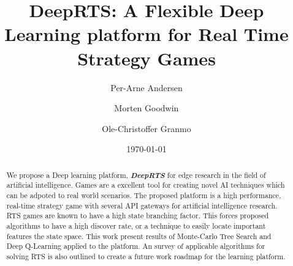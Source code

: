 \documentclass[fleqn,10pt]{article} %
\title{DeepRTS: A Flexible Deep Learning platform for Real Time Strategy Games}
\date{\today}
\author{Per-Arne Andersen \and Morten Goodwin \and Ole-Christoffer Granmo}
\begin{document}
\flushbottom %

\maketitle %

\begin{abstract}
We propose a Deep learning platform, \textit{\textbf{DeepRTS}} for edge research in the field of artificial intelligence. 
Games are a excellent tool for creating novel AI techniques which can be adpoted to real world scenarios. The proposed platform is a high performance, real-time strategy game with several API gateways for artificial intelligence research. RTS games are known to have a high state branching factor. This forces proposed algorithms to have a high discover rate, or a technique to easily locate important features the state space. This work present results of Monte-Carlo Tree Search and Deep Q-Learning applied to the platform. An survey of applicable algorithms for solving RTS is also outlined to create a future work roadmap for the learning platform.
\end{abstract}

\newpage

\tableofcontents %

\thispagestyle{empty} %
\newpage
\end{document}
